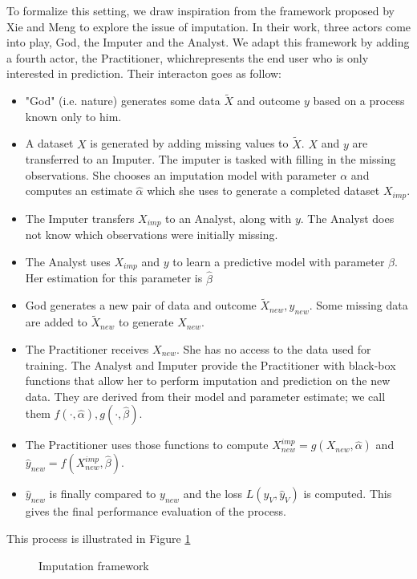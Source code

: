 To formalize this setting, we draw inspiration from the framework proposed by Xie and Meng \cite{xie2017framework} to explore the issue of imputation. In their work, three actors come into play, God, the Imputer and the Analyst. We adapt this framework by adding a fourth actor, the Practitioner, whichrepresents the end user who is only interested in prediction. Their interacton goes as follow:
\begin{itemize}
 \item "God" (i.e. nature) generates some data $\tilde{X}$ and outcome $y$ based on a process known only to him. 
 \item A dataset $X$ is generated by adding missing values to $\tilde{X}$. $X$ and $y$ are transferred to an Imputer. The imputer is tasked with filling in the missing observations. She chooses an imputation model with parameter $\alpha$ and computes an estimate $\hat{\alpha}$ which she uses to generate a completed dataset $X_{imp}$.
 \item  The Imputer transfers $X_{imp}$ to an Analyst, along with $y$. The Analyst does not know which observations were initially missing.
 \item The Analyst uses $X_{imp}$ and $y$ to learn a predictive model with parameter $\beta$. Her estimation for this parameter is $\hat{\beta}$
 \item God generates a new pair of data and outcome $\tilde{X}_{new}, y_{new}$. Some missing data are added to  $\tilde{X}_{new}$ to generate $X_{new}$.
 \item The Practitioner receives $X_{new}$. She has no access to the data used for training. The Analyst and Imputer provide the Practitioner with black-box functions that allow her to perform imputation and prediction on the new data. They are derived from their model and parameter estimate; we call them $f(\cdot,\hat{\alpha}),g(\cdot,\hat{\beta})$.
 \item The Practitioner uses those functions to compute $X_{new}^{imp} = g(X_{new},\hat{\alpha})$ and $\hat{y}_{new}= f(X_{new}^{imp},\hat{\beta})$.
 \item $\hat{y}_{new}$ is finally compared to $y_{new}$ and the loss $L(y_V, \hat{y}_V)$ is computed. This gives the final performance evaluation of the process.
\end{itemize}

This process is illustrated in Figure \ref{fig.tikz_imp}

\begin{figure}[H]
  \caption{Imputation framework}
  \label{fig.tikz_imp}
\end{figure}

